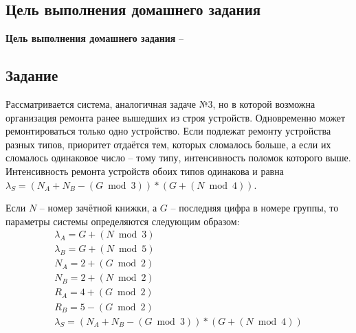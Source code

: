 \subsection{Цель выполнения домашнего задания}\label{blockN.VariantM}
\textbf{Цель выполнения домашнего задания }-- \GoalOfResearch

\subsection{Задание}
Рассматривается система, аналогичная задаче $№3$, но в которой возможна организация ремонта ранее вышедших из строя устройств.
Одновременно может ремонтироваться только одно устройство.
Если подлежат ремонту устройства разных типов, приоритет отдаётся тем, которых сломалось больше,
а если их сломалось одинаковое число – тому типу, интенсивность поломок которого выше.
Интенсивность ремонта устройств обоих типов одинакова и равна $\lambda_S = (N_A + N_B - (G \bmod 3)) * (G + (N \bmod 4))$.


Если $N$ – номер зачётной книжки, а $G$ – последняя цифра в номере группы,
то параметры системы определяются следующим образом:
\[
\begin{matrix}
    \lambda_A= G + (N \bmod 3) \\
    \lambda_B= G + (N \bmod 5) \\
    N_A= 2 + (G \bmod 2) \\
    N_B= 2 + (N \bmod 2) \\
    R_A= 4 + (G \bmod 2) \\
    R_B= 5 - (G \bmod 2) \\
    \lambda_S = (N_A + N_B - (G \bmod 3)) * (G + (N \bmod 4))
\end{matrix}
\]

